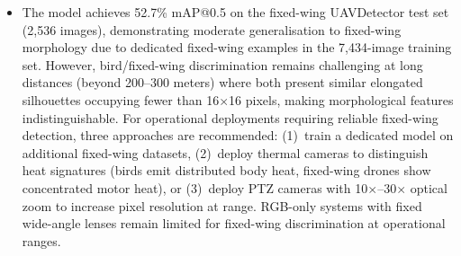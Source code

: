 \documentclass[12pt,a4paper]{report}
\begin{document}
\begin{itemize}
        Jetson-Nano-class hardware, and the model ran without crashes or
        throughput regressions, but no FPS/latency/power figures were logged
        during that run. The quantitative deployment expectations in this
        report therefore rely on third-party benchmarks (Stäcker et
        al.~\cite{stacker2021}) rather than measurements taken on the
        project's own models.
  \item The model achieves
        52.7\% mAP@0.5 on the fixed-wing UAVDetector test set (2,536 images),
        demonstrating moderate generalisation to fixed-wing morphology due to
        dedicated fixed-wing examples in the 7,434-image training set. However,
        bird/fixed-wing discrimination remains challenging at long distances
        (beyond 200--300 meters) where both present similar elongated silhouettes
        occupying fewer than 16$\times$16 pixels, making morphological features
        indistinguishable. For operational deployments requiring reliable fixed-wing
        detection, three approaches are recommended: (1)~train a dedicated model
        on additional fixed-wing datasets, (2)~deploy thermal cameras to distinguish
        heat signatures (birds emit distributed body heat, fixed-wing drones show
        concentrated motor heat), or (3)~deploy PTZ cameras with 10$\times$--30$\times$
        optical zoom to increase pixel resolution at range. RGB-only systems with
        fixed wide-angle lenses remain limited for fixed-wing discrimination at
        operational ranges.
\end{itemize}
\end{document}
